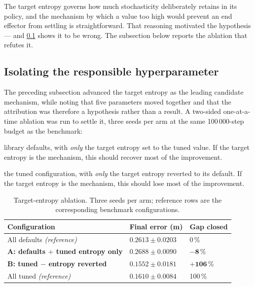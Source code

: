 The target entropy governs how much stochasticity \SAC deliberately retains in
its policy, and the mechanism by which a value too high would prevent an end
effector from settling is straightforward. That reasoning motivated the
hypothesis --- and \cref{sec:ablation} shows it to be wrong. The subsection
below reports the ablation that refutes it.

\subsection{Isolating the responsible hyperparameter}
\label{sec:ablation}

The preceding subsection advanced the target entropy as the leading candidate
mechanism, while noting that five parameters moved together and that the
attribution was therefore a hypothesis rather than a result. A two-sided
one-at-a-time ablation was run to settle it, three seeds per arm at the same
100\,000-step budget as the benchmark:

\begin{description}[leftmargin=1.6em, itemsep=3pt]
\item[Arm A] library defaults, with \emph{only} the target entropy set to the
tuned value. If the target entropy is the mechanism, this should recover most of
the improvement.
\item[Arm B] the tuned configuration, with \emph{only} the target entropy
reverted to its default. If the target entropy is the mechanism, this should
lose most of the improvement.
\end{description}

\begin{table}[H]
\centering
\caption{Target-entropy ablation. Three seeds per arm; reference rows are the
corresponding benchmark configurations.}
\begin{tabular}{@{} L{7.2cm} C{3.2cm} C{2.6cm} @{}}
\toprule
\textbf{Configuration} & \textbf{Final error (m)} & \textbf{Gap closed} \\
\midrule
All defaults \emph{(reference)} & $0.2613 \pm 0.0203$ & 0\,\% \\
\textbf{A: defaults $+$ tuned entropy only} & $\mathbf{0.2688 \pm 0.0090}$ & $\mathbf{-8}$\,\% \\
\textbf{B: tuned $-$ entropy reverted} & $\mathbf{0.1552 \pm 0.0181}$ & $\mathbf{+106}$\,\% \\
All tuned \emph{(reference)} & $0.1610 \pm 0.0084$ & 100\,\% \\
\bottomrule
\end{tabular}
\label{tab:ablation}
\end{table}

